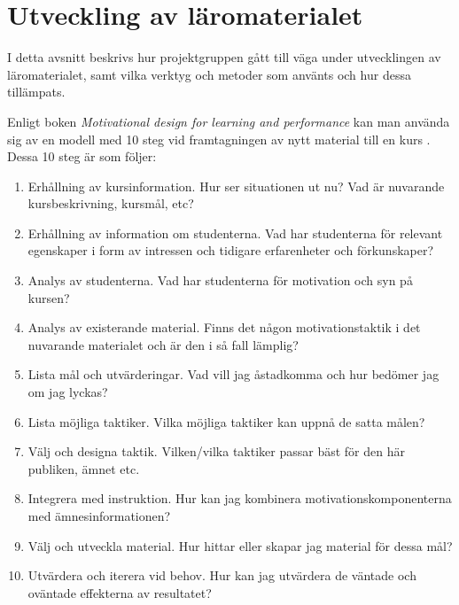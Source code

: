 \documentclass[]{article}
\begin{document}
\section{Utveckling av läromaterialet}
\label{sec:utveckling}



I detta avsnitt beskrivs hur projektgruppen gått till väga under
utvecklingen av läromaterialet, samt vilka verktyg och metoder som
använts och hur dessa tillämpats.

Enligt boken \textit{Motivational design for learning and performance}
kan man använda sig av en modell med 10 steg vid framtagningen av nytt
material till en kurs \cite{motivational_design}. Dessa 10 steg är som följer:

\begin{enumerate}
\item Erhållning av kursinformation. Hur ser situationen ut nu? Vad är
 nuvarande kursbeskrivning, kursmål, etc?

\item Erhållning av information om studenterna. Vad har studenterna
 för relevant egenskaper i form av intressen och tidigare
 erfarenheter och förkunskaper?

\item Analys av studenterna. Vad har studenterna för motivation och
 syn på kursen?

\item Analys av existerande material. Finns det någon
 motivationstaktik i det nuvarande materialet och är den i så fall
 lämplig?

\item Lista mål och utvärderingar. Vad vill jag åstadkomma och hur
 bedömer jag om jag lyckas?

\item Lista möjliga taktiker. Vilka möjliga taktiker kan uppnå de
 satta målen?

\item Välj och designa taktik. Vilken/vilka taktiker passar bäst för
 den här publiken, ämnet etc.

\item Integrera med instruktion. Hur kan jag kombinera
 motivationskomponenterna med ämnesinformationen?

\item Välj och utveckla material. Hur hittar eller skapar jag material
 för dessa mål?

\item Utvärdera och iterera vid behov. Hur kan jag utvärdera de
 väntade och oväntade effekterna av resultatet?

\end{enumerate}
\end{document}
